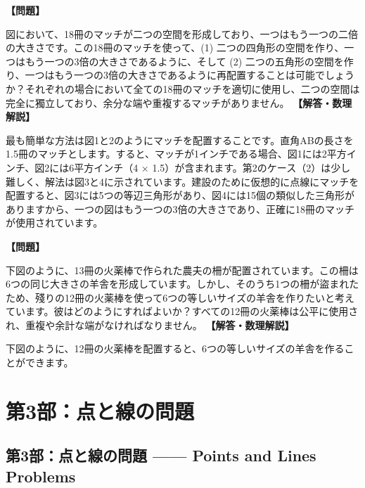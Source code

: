 \documentclass[10pt,a4paper,oneside,openany]{ltjsbook}
\begin{document}
\begin{tcolorbox}[colback=softblue,colframe=primaryblue,title=\textbf{第 204 問：新しいマッチパズル （原題: A NEW MATCH PUZZLE.）},arc=2mm,boxrule=1pt,breakable]
\textbf{【問題】}\par\vspace{0.3em}
図において、18冊のマッチが二つの空間を形成しており、一つはもう一つの二倍の大きさです。この18冊のマッチを使って、(1) 二つの四角形の空間を作り、一つはもう一つの3倍の大きさであるように、そして (2) 二つの五角形の空間を作り、一つはもう一つの3倍の大きさであるように再配置することは可能でしょうか？それぞれの場合において全ての18冊のマッチを適切に使用し、二つの空間は完全に獨立しており、余分な端や重複するマッチがありません。
\tcblower
\textbf{【解答・数理解説】}\par\vspace{0.3em}
最も簡単な方法は図1と2のようにマッチを配置することです。直角ABの長さを1.5冊のマッチとします。すると、マッチが1インチである場合、図1には2平方インチ、図2には6平方インチ（4 × 1.5）が含まれます。第2のケース（2）は少し難しく、解法は図3と4に示されています。建設のために仮想的に点線にマッチを配置すると、図3には5つの等辺三角形があり、図4には15個の類似した三角形がありますから、一つの図はもう一つの3倍の大きさであり、正確に18冊のマッチが使用されています。
\end{tcolorbox}

\begin{tcolorbox}[colback=softblue,colframe=primaryblue,title=\textbf{第 205 問：六つの羊舎を作る （原題: THE SIX SHEEP-PENS.）},arc=2mm,boxrule=1pt,breakable]
\textbf{【問題】}\par\vspace{0.3em}
下図のように、13冊の火薬棒で作られた農夫の柵が配置されています。この柵は6つの同じ大きさの羊舎を形成しています。しかし、そのうち1つの柵が盜まれたため、殘りの12冊の火薬棒を使って6つの等しいサイズの羊舎を作りたいと考えています。彼はどのようにすればよいか？すべての12冊の火薬棒は公平に使用され、重複や余計な端がなければなりません。
\tcblower
\textbf{【解答・数理解説】}\par\vspace{0.3em}
下図のように、12冊の火薬棒を配置すると、6つの等しいサイズの羊舎を作ることができます。
\end{tcolorbox}

\part{第3部：点と線の問題}
\chapter*{第3部：点と線の問題 —— Points and Lines Problems}
\end{document}

